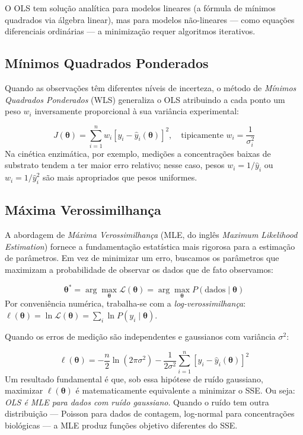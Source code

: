 O OLS tem solução analítica para modelos lineares (a fórmula de mínimos quadrados via
álgebra linear), mas para modelos não-lineares --- como equações diferenciais ordinárias
--- a minimização requer algoritmos iterativos.

\subsection{Mínimos Quadrados Ponderados}

Quando as observações têm diferentes níveis de incerteza, o método de \emph{Mínimos
Quadrados Ponderados} (WLS) generaliza o OLS atribuindo a cada ponto um peso $w_i$
inversamente proporcional à sua variância experimental:

\begin{equation}
J(\boldsymbol{\theta}) = \sum_{i=1}^{n} w_i \left[y_i - \hat{y}_i(\boldsymbol{\theta})\right]^2,
\quad \text{tipicamente } w_i = \frac{1}{\sigma_i^2}
\end{equation}
Na cinética enzimática, por exemplo, medições a concentrações baixas de substrato tendem a
ter maior erro relativo; nesse caso, pesos $w_i = 1/\hat{y}_i$ ou $w_i = 1/\hat{y}_i^2$
são mais apropriados que pesos uniformes.

\subsection{Máxima Verossimilhança}

A abordagem de \emph{Máxima Verossimilhança} (MLE, do inglês \textit{Maximum Likelihood
Estimation}) fornece a fundamentação estatística mais rigorosa para a estimação de
parâmetros. Em vez de minimizar um erro, buscamos os parâmetros que maximizam a
probabilidade de observar os dados que de fato observamos:

\begin{equation}
\boldsymbol{\theta}^* = \arg\max_{\boldsymbol{\theta}} \mathcal{L}(\boldsymbol{\theta}) =
\arg\max_{\boldsymbol{\theta}} P(\text{dados} \mid \boldsymbol{\theta})
\end{equation}
Por conveniência numérica, trabalha-se com a \emph{log-verossimilhança}:
$\ell(\boldsymbol{\theta}) = \ln \mathcal{L}(\boldsymbol{\theta}) = \sum_i \ln P(y_i \mid \boldsymbol{\theta})$.

Quando os erros de medição são independentes e gaussianos com variância $\sigma^2$:

\begin{equation}
\ell(\boldsymbol{\theta}) = -\frac{n}{2}\ln(2\pi\sigma^2) -
\frac{1}{2\sigma^2} \sum_{i=1}^{n}\left[y_i - \hat{y}_i(\boldsymbol{\theta})\right]^2
\end{equation}
Um resultado fundamental é que, sob essa hipótese de ruído gaussiano, maximizar
$\ell(\boldsymbol{\theta})$ é matematicamente equivalente a minimizar o SSE. Ou seja:
\emph{OLS é MLE para dados com ruído gaussiano}. Quando o ruído tem outra distribuição
--- Poisson para dados de contagem, log-normal para concentrações biológicas ---
a MLE produz funções objetivo diferentes do SSE.


